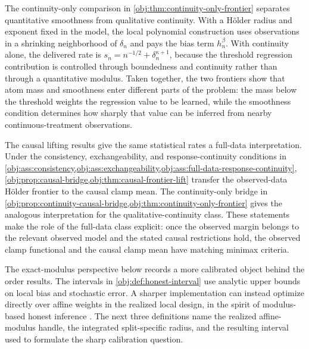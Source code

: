 \documentclass[11pt]{article}
\begin{document}
The continuity-only comparison in \cref{obj:thm:continuity-only-frontier} separates quantitative smoothness from qualitative continuity. With a Hölder radius and exponent fixed in the model, the local polynomial construction uses observations in a shrinking neighborhood of \(\delta_n\) and pays the bias term \(h_n^\beta\). With continuity alone, the delivered rate is \(s_n=n^{-1/2}+\delta_n^{\kappa+1}\), because the threshold regression contribution is controlled through boundedness and continuity rather than through a quantitative modulus. Taken together, the two frontiers show that atom mass and smoothness enter different parts of the problem: the mass below the threshold weights the regression value to be learned, while the smoothness condition determines how sharply that value can be inferred from nearby continuous-treatment observations.

The causal lifting results give the same statistical rates a full-data interpretation. Under the consistency, exchangeability, and response-continuity conditions in \cref{obj:ass:consistency,obj:ass:exchangeability,obj:ass:full-data-response-continuity}, \cref{obj:prop:causal-bridge,obj:thm:causal-frontier-lift} transfer the observed-data Hölder frontier to the causal clamp mean. The continuity-only bridge in \cref{obj:prop:continuity-causal-bridge,obj:thm:continuity-only-frontier} gives the analogous interpretation for the qualitative-continuity class. These statements make the role of the full-data class explicit: once the observed margin belongs to the relevant observed model and the stated causal restrictions hold, the observed clamp functional and the causal clamp mean have matching minimax criteria.

The exact-modulus perspective below records a more calibrated object behind the order results. The intervals in \cref{obj:def:honest-interval} use analytic upper bounds on local bias and stochastic error. A sharper implementation can instead optimize directly over affine weights in the realized local design, in the spirit of modulus-based honest inference \citep{ArmstrongKolesar2018OptimalInference,ArmstrongKolesar2020}. The next three definitions name the realized affine-modulus handle, the integrated split-specific radius, and the resulting interval used to formulate the sharp calibration question.
\end{document}
